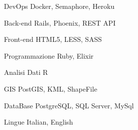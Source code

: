 

\begin{cvskills}

  \cvskill
    {DevOps} %
    {Docker, Semaphore, Heroku} %

  \cvskill
    {Back-end} %
    {Rails, Phoenix, REST API} %

  \cvskill
    {Front-end} %
    {HTML5, LESS, SASS} %

  \cvskill
    {Programmazione} %
    {Ruby, Elixir} %

  \cvskill
    {Analisi Dati} %
    {R} %

  \cvskill
    {GIS} %
    {PostGIS, KML, ShapeFile} %

  \cvskill
    {DataBase} %
    {PostgreSQL, SQL Server, MySql} %

  \cvskill
    {Lingue} %
    {Italian, English} %

\end{cvskills}
